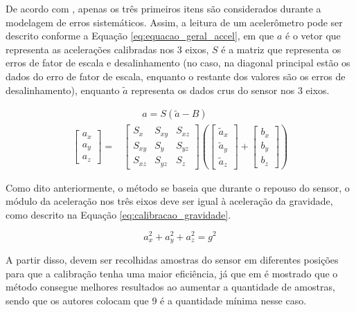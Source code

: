 \documentclass[acronym, symbols, table]{fei}
\begin{document}
			De acordo com \textcite{hassan2020field}, apenas os três primeiros itens são considerados durante a modelagem de erros sistemáticos. Assim, a leitura de um acelerômetro pode ser descrito conforme a Equação \ref{eq:equacao_geral_accel}, em que $a$ é o vetor que representa as acelerações calibradas nos 3 eixos, $S$ é a matriz que representa os erros de fator de escala e desalinhamento (no caso, na diagonal principal estão os dados do erro de fator de escala, enquanto o restante dos valores são os erros de desalinhamento), enquanto $\tilde{a}$ representa os dados crus do sensor nos 3 eixos.
			
			\begin{equation}\label{eq:equacao_geral_accel}
				\begin{split}
					&\quad \quad a = S(\tilde{a} - B) \\
					\begin{bmatrix}
						a_x \\ a_y \\ a_z
					\end{bmatrix} = 
					&\begin{bmatrix}
						S_x & S_{xy} & S_{xz} \\ S_{xy} & S_y & S_{yz} \\ S_{xz} & S_{yz} & S_z
					\end{bmatrix} \left(
					\begin{bmatrix}
						\tilde{a}_x \\ \tilde{a}_y \\ \tilde{a}_z
					\end{bmatrix} + 
					\begin{bmatrix}
						b_x \\ b_y \\ b_z
					\end{bmatrix}\right)
				\end{split}
			\end{equation}
			
			Como dito anteriormente, o método se baseia que durante o repouso do sensor, o módulo da aceleração nos três eixos deve ser igual à aceleração da gravidade, como descrito na Equação \ref{eq:calibracao_gravidade}.
			
			\begin{equation} \label{eq:calibracao_gravidade}
				a_{x}^{2} + a_{y}^{2} + a_{z}^{2} = g^{2}
			\end{equation}
			
			A partir disso, devem ser recolhidas amostras do sensor em diferentes posições para que a calibração tenha uma maior eficiência, já que em \textcite{menezes2020triaxial} é mostrado que o método consegue melhores resultados ao aumentar a quantidade de amostras, sendo que os autores colocam que 9 é a quantidade mínima nesse caso.
			
\end{document}
